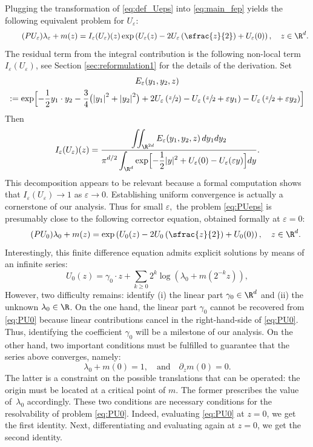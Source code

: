 \documentclass[JEP,XML,SOM,Unicode]{cedram}
\theoremstyle{plain}
\theoremstyle{definition}
\let\eps\varepsilon
\let\ds\displaystyle
\newcommand{\abs}[1]{\left\lvert#1\right\rvert}
\begin{document}
Plugging the transformation of \eqref{eq:def_Ueps} into \eqref{eq:main_fep} yields the following equivalent problem for $U_\eps$:
\begin{equation}
\label{eq:PUeps}\tag{$PU_\eps$} \lambda_\eps + m(z) = I_\eps(U_\eps)(z) \exp \left(U_\eps(z)-2U_\eps\left(\sfrac{z}{2} \right) + U_\eps(0) \right), \quad z \in \R^d.
\end{equation}
The residual term from the integral contribution is the following non-local term $I_\eps(U_\eps)$, see Section \ref{sec:reformulation1} for the details of the derivation. Set
\begin{multline*}
E_\eps(y_1,y_2,z)\\
:=\exp \Bigl[-\dfrac{1}{2}y_1 \cdot y_2 - \dfrac{3}{4}\bigl (\abs{y_1}^2+\abs{y_2}^2 \bigr) +2 U_\eps\left(\sfrac{z}{2} \right) - U_\eps\left(\sfrac{z}{2}+\eps y_1 \right) - U_\eps\left(\sfrac{z}{2} +\eps y_2\right) \Bigr]
\end{multline*}
Then
\begin{equation}\label{eq:def_Ieps_int}
I_\eps(U_\eps)(z)= \dfrac{\ds \iint_{\R^{2d}} E_\eps(y_1,y_2,z)\, d y_1 d y_2 }
{\ds \pi^{d/2} \int_{\R^d} \exp\Bigl[ - \frac12 |y|^2 + U_\eps(0)- U_\eps(\eps y) \Bigr] d y}.
\end{equation}
This decomposition appears to be relevant because a formal computation shows that $I_\eps(U_\eps)\to 1$ as $\eps\to 0$. Establishing uniform convergence is actually a cornerstone of our analysis. Thus for small $\eps,$ the problem \eqref{eq:PUeps} is presumably close to the following corrector equation, obtained formally at $\eps =0$:
\begin{equation}\label{eq:PU0}\tag{$PU_0$}
\lambda_0 +m(z) = \exp \left(U_0(z)-2U_0\left(\sfrac{z}{2}\right) + U_0(0) \right), \quad z \in \R^d.
\end{equation}
Interestingly, this finite difference equation admits explicit solutions by means of an infinite series:
\begin{equation*}
U_0(z) = \gamma_0\cdot z + \sum_{k\geq 0} 2^k \log \left(\lambda_0 + m(2^{-k}z)\right),
\end{equation*}
However, two difficulty remains: identify (i) the linear part $\gamma_0\in\R^d$ and (ii) the unknown $\lambda_0\in\R$.
On the one hand, the linear part $\gamma_0$ cannot be recovered from \eqref{eq:PU0} because linear contributions cancel in the right-hand-side of \eqref{eq:PU0}. Thus, identifying the coefficient $\gamma_0$ will be a milestone of our analysis. On the other hand, two important conditions must be fulfilled to guarantee that the series above converges, namely:
\[ \lambda_0 + m(0) = 1,\quad \text{and} \quad \partial_z m(0) = 0.\]
The latter is a constraint on the possible translations that can be operated: the origin must be located at a critical point of $m$. The former prescribes the value of~$\lambda_0$ accordingly. These two conditions are necessary conditions for the resolvability of problem \eqref{eq:PU0}. Indeed, evaluating \eqref{eq:PU0} at $z=0$, we get the first identity. Next, differentiating and evaluating again at $z = 0$, we get the second identity.
\end{document}
